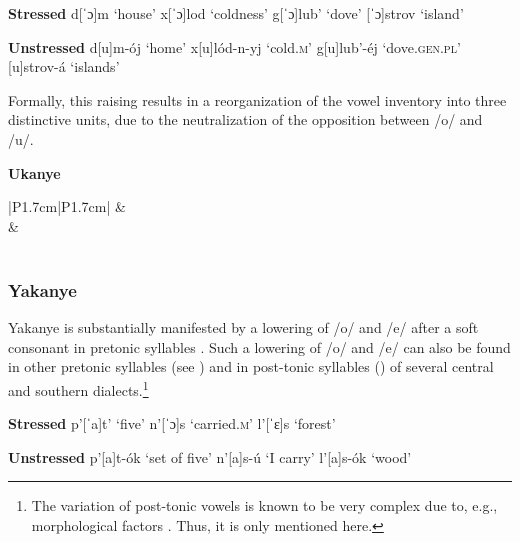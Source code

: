 \documentclass[output=paper,
modfonts,
newtxmath,
hidelinks,
]{langscibook}
\begin{document}
\ea\label{13}\begin{multicols}{2}
\begin{xlist}
\exi{} \textbf{Stressed}
\ex d[ˈɔ]m \tabto{2.1cm}‘house’\label{13a}
\exi{} x[ˈɔ]lod \tabto{2.1cm}‘coldness’
\ex g[ˈɔ]lub’ \tabto{2.1cm}‘dove’\label{13b}
\exi{} {[ˈɔ]strov} \tabto{2.1cm}‘island’
\end{xlist}\columnbreak
\begin{xlist}
\exi{} \textbf{Unstressed}
\exi{} d[u]m-ój \tabto{2.1cm}‘home’
\exi{} x[u]lód-n-yj \tabto{2.1cm}‘cold.\textsc{m}’
\exi{} g[u]lub’-éj \tabto{2.1cm}‘dove.\textsc{gen.pl}’
\exi{} {[u]strov-á} \tabto{2.1cm}‘islands’
\end{xlist}
\end{multicols}
\z

\noindent Formally, this raising results in a reorganization of the vowel inventory into three distinctive units, due to the neutralization of the opposition between /o/ and /u/.

\ea \textbf{Ukanye}\label{14}\\\medskip
\begin{tabular}{|P{1.7cm}|P{1.7cm}|}
\hline
[ɨ]&\\\hhline{-~}
\shadecell{}&\\\hline
{}\\\hline
\end{tabular}
\z


\subsubsection{Yakanye}\label{s2.3.2}

Yakanye is substantially manifested by a lowering of /o/ and /e/ after a soft consonant in pretonic syllables . Such a lowering of /o/ and /e/ can also be found in other pretonic syllables (see \citealt[§96]{Avanesov1949}) and in post-tonic syllables (\citealt[§108--112]{Avanesov1949}) of several central and southern dialects.\footnote{The variation of post-tonic vowels is known to be very complex due to, e.g., morphological factors \citep[§107]{Avanesov1949}. Thus, it is only mentioned here.}\vspace{-\baselineskip}

\ea\label{15}\begin{multicols}{2}
\begin{xlist}
\exi{} \textbf{Stressed}
\exi{} p’[ˈa]t’ \tabto{2.1cm}‘five’
\exi{} n’[ˈɔ]s \tabto{2.1cm}‘carried.\textsc{m}’
\exi{} l’[ˈɛ]s \tabto{2.1cm}‘forest’
\end{xlist}\columnbreak
\begin{xlist}
\exi{} \textbf{Unstressed}
\exi{} p’[a]t-ók \tabto{2.1cm}‘set of five’
\exi{} n’[a]s-ú \tabto{2.1cm}‘I carry’
\exi{} l’[a]s-ók \tabto{2.1cm}‘wood’
\end{xlist}
\end{multicols}
\z
\end{document}
